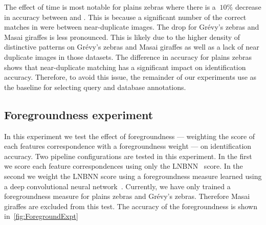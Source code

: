         \BaselineExpt{}

        \begin{comment}
        python -m ibeis -e print --db PZ_Master1 -a ctrl timectrl -t baseline  
        python -m ibeis -e print --db GZ_Master1 -a ctrl timectrl -t baseline  
        python -m ibeis -e print --db GIRM_Master1 -a ctrl timectrl1h -t baseline  
        \end{comment}
        The effect of time is most notable for plains zebras where there is a $~10\percent$ decrease in accuracy
          between \ctrl{} and \timectrl{}.
        This is because a significant number of the correct matches in \ctrl{} were between near-duplicate
          images.
        The drop for Grévy's zebras and Masai giraffes is less pronounced.
        This is likely due to the higher density of distinctive patterns on Grévy's zebras and Masai giraffes as
          well as a lack of near duplicate images in those datasets.
        The difference in accuracy for plains zebras shows that near-duplicate matching has a significant impact
          on identification accuracy.
        Therefore, to avoid this issue, the remainder of our experiments use \timectrl{} as the baseline for
          selecting query and database annotations.

    \subsection{Foregroundness experiment}\label{sub:exptfeatmatchscore}

        \ForegroundExpt{}

        In this experiment we test the effect of foregroundness --- weighting the score of each features
          correspondence with a foregroundness weight --- on identification accuracy.
        Two pipeline configurations are tested in this experiment.
        In the first we score each feature correspondences using only the LNBNN~\cite{mccann_local_2012} score.
        In the second we weight the LNBNN score using a foregroundness measure learned using a deep convolutional
          neural network~\cite{parham_photographic_2015}.
        Currently, we have only trained a foregroundness measure for plains zebras and Grévy's zebras.
        Therefore Masai giraffes are excluded from this test.
        The accuracy of the foregroundness is shown in~\cref{fig:ForegroundExpt}

